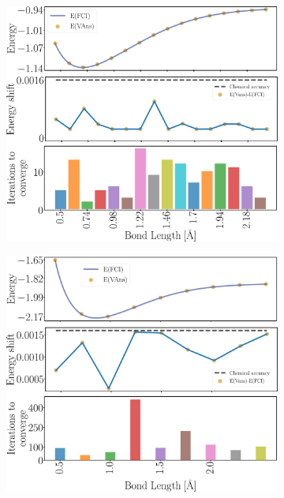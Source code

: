 \begin{figure}[b!]
\centering
  \begin{subfigure}[b]{.49\textwidth}
      \centering
      \includegraphics[width=1.\textwidth]{Figures/VANS/Fig9.pdf}
      \caption{}
      \label{fig:h22}
  \end{subfigure}
  \hfill
  \begin{subfigure}[b]{.49\textwidth}
      \centering
      \includegraphics[width=1.\textwidth]{Figures/VANS/Fig12.pdf}

\end{subfigure}
\end{figure}
